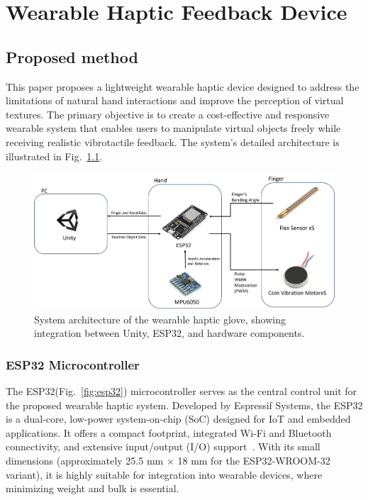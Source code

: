 \chapter{Wearable Haptic Feedback Device} %

\label{Chapter3} %
\section{Proposed method}
This paper proposes a lightweight wearable haptic device designed to address the limitations of natural hand interactions and improve the perception of virtual textures. The primary objective is to create a cost-effective and responsive wearable system that enables users to manipulate virtual objects freely while receiving realistic vibrotactile feedback. The system's detailed architecture is illustrated in Fig.~\ref{fig:system_diagram}.

\begin{figure}[H]\centering
	\includegraphics[width=1\textwidth]{Pictures/system_diagram.png}%
	\caption{System architecture of the wearable haptic glove, showing integration between Unity, ESP32, and hardware components.}\label{fig:system_diagram}%
\end{figure}
\subsection{ESP32 Microcontroller}
The ESP32(Fig.~\ref{fig:esp32}) microcontroller serves as the central control unit for the proposed wearable haptic system. Developed by Espressif Systems, the ESP32 is a dual-core, low-power system-on-chip (SoC) designed for IoT and embedded applications. It offers a compact footprint, integrated Wi-Fi and Bluetooth connectivity, and extensive input/output (I/O) support~\cite{esp32docs}. With its small dimensions (approximately 25.5 mm × 18 mm for the ESP32-WROOM-32 variant), it is highly suitable for integration into wearable devices, where minimizing weight and bulk is essential.

